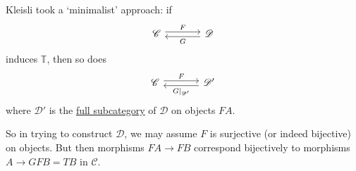 \documentclass{article}
\let\to\longrightarrow
\begin{document}
Kleisli took a `minimalist' approach: if
\begin{equation*}
  \begin{tikzcd}[column sep=large]
    \mathscr{C} \rar[shift left]{F} & \mathscr{D} \lar[shift left]{G}
  \end{tikzcd}
\end{equation*}
induces $\mathbb{T}$, then so does
\begin{equation*}
  \begin{tikzcd}[column sep=large]
    \mathscr{C} \rar[shift left]{F} & \mathscr{D}' \lar[shift left]{G|_{\mathscr{D}'}}
  \end{tikzcd}
\end{equation*}
where $\mathscr{D}'$ is the \hyperlink{def:fulls}{full subcategory} of $\mathscr{D}$ on objects $FA$.

So in trying to construct $\mathscr{D}$, we may assume $F$ is surjective (or indeed bijective) on objects.
But then morphisms $FA \to FB$ correspond bijectively to morphisms $A \to GFB = TB$ in $\mathscr{C}$.
\end{document}
